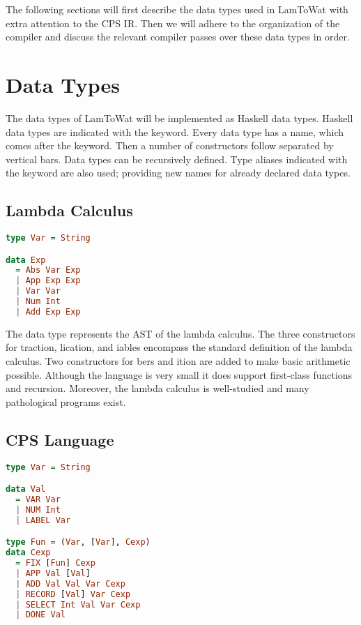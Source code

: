 The following sections will first describe the data types used in LamToWat with extra attention to the \ac{CPS} \ac{IR}. Then we will adhere to the organization of the compiler and discuss the relevant compiler passes over these data types in order.

\section{\label{section:datatypes}Data Types}
The data types of LamToWat will be implemented as Haskell data types. Haskell data types are indicated with the  keyword. Every data type has a name, which comes after the keyword. Then a number of constructors follow separated by vertical bars. Data types can be recursively defined. Type aliases indicated with the  keyword are also used; providing new names for already declared data types.

\subsection{\label{subsection:expdata}Lambda Calculus}
\begin{lstlisting}[language=Haskell]
type Var = String

data Exp
  = Abs Var Exp
  | App Exp Exp
  | Var Var
  | Num Int
  | Add Exp Exp
\end{lstlisting}

The  data type represents the \ac{AST} of the lambda calculus. The three constructors for traction, lication, and iables encompass the standard definition of the lambda calculus. Two constructors for bers and ition are added to make basic arithmetic possible. Although the language is very small it does support first-class functions and recursion. Moreover, the lambda calculus is well-studied \autocite{barendregt1984lambda} and many pathological programs exist.

\subsection{\label{subsection:cpsdata}CPS Language}
\begin{lstlisting}[language=Haskell]
type Var = String

data Val
  = VAR Var
  | NUM Int
  | LABEL Var

type Fun = (Var, [Var], Cexp)
data Cexp
  = FIX [Fun] Cexp
  | APP Val [Val]
  | ADD Val Val Var Cexp
  | RECORD [Val] Var Cexp
  | SELECT Int Val Var Cexp
  | DONE Val
\end{lstlisting}

